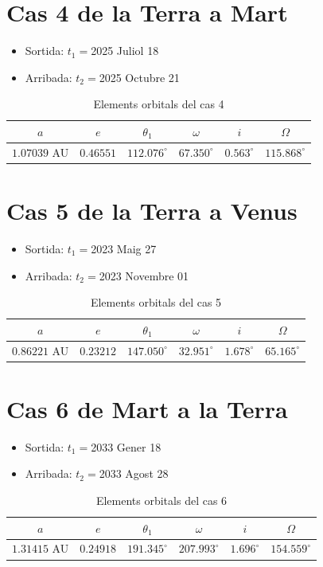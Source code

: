 \section{Cas 4 de la Terra a Mart}
\begin{itemize}
	\item Sortida: $t_{1}=$2025 Juliol 18
	\item Arribada: $t_{2}=$2025 Octubre 21
\end{itemize}
\begin{table}[h!]
	\centering
	\begin{tabular}{ |c|c|c|c|c|c|}
		\hline
		$a$ & $e$ & $\theta_{1}$ & $\omega$ & $i$ & $\Omega$ \\ \hline
		$1.07039$ AU  & $0.46551$ & $112.076^{\circ}$ & $67.350^{\circ}$ & $0.563^{\circ}$ & $115.868^{\circ}$ \\ \hline
	\end{tabular}
	\caption{Elements orbitals del cas 4}
\end{table}

\section{Cas 5 de la Terra a Venus}
\begin{itemize}
	\item Sortida: $t_{1}=$2023 Maig 27
	\item Arribada: $t_{2}=$2023 Novembre 01
\end{itemize}
\begin{table}[h!]
	\centering
	\begin{tabular}{ |c|c|c|c|c|c|}
		\hline
		$a$ & $e$ & $\theta_{1}$ & $\omega$ & $i$ & $\Omega$ \\ \hline
		$0.86221$ AU  & $0.23212$ & $147.050^{\circ}$ & $32.951^{\circ}$ & $1.678^{\circ}$ & $65.165^{\circ}$ \\ \hline
	\end{tabular}
	\caption{Elements orbitals del cas 5}
\end{table}

\section{Cas 6 de Mart a la Terra}
\begin{itemize}
	\item Sortida: $t_{1}=$2033 Gener 18
	\item Arribada: $t_{2}=$2033 Agost 28
\end{itemize}
\begin{table}[h!]
	\centering
	\begin{tabular}{ |c|c|c|c|c|c|}
		\hline
		$a$ & $e$ & $\theta_{1}$ & $\omega$ & $i$ & $\Omega$ \\ \hline
		$1.31415$ AU  & $0.24918$ & $191.345^{\circ}$ & $207.993^{\circ}$ & $1.696^{\circ}$ & $154.559^{\circ}$ \\ \hline
	\end{tabular}
	\caption{Elements orbitals del cas 6}
\end{table}

